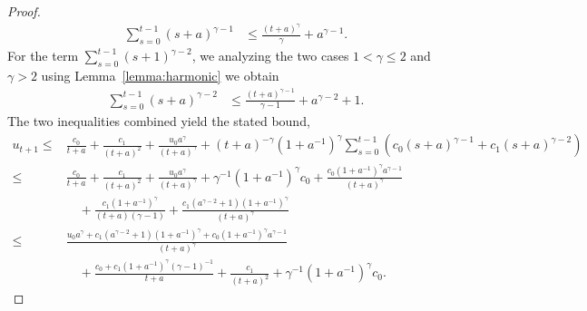 \begin{proof}
\begin{align*}
    \sum_{s=0}^{t-1}(s+a)^{\gamma - 1} &\leq \frac{(t+a)^\gamma}{\gamma} + a ^ {\gamma - 1}.
\end{align*}
For the term $\sum_{s=0}^{t-1}(s+1)^{\gamma - 2}$, we analyzing the two cases $1 < \gamma \leq 2$ and $\gamma > 2$ using Lemma~\ref{lemma:harmonic} we obtain
\begin{align*}
    \sum_{s=0}^{t-1}(s+a)^{\gamma - 2} &\leq \frac{(t+a)^{\gamma-1}}{\gamma - 1} + a^{\gamma - 2} + 1.
\end{align*}
The two inequalities combined yield the stated bound,
\begin{align*}
    u_{t+1} \leq & \frac{c_0}{t+a} + \frac{c_1}{(t+a)^2} + \frac{u_0 a ^ \gamma}{\left(t+a\right)^\gamma} + (t+a)^{-\gamma} (1 + a^{-1})^\gamma \sum_{s=0}^{t-1} \left( c_0(s+a)^{\gamma-1} + c_1(s+a)^{\gamma - 2} \right) \\
    \leq & \frac{c_0}{t+a} + \frac{c_1}{(t+a)^2} + \frac{u_0 a ^ \gamma}{\left(t+a\right)^\gamma} + \gamma^{-1}(1+a^{-1})^\gamma c_0 + \frac{c_0 (1+a^{-1})^\gamma a^{\gamma-1}}{(t+a)^\gamma} \\ 
    &\quad +\frac{c_1 (1+a^{-1})^\gamma}{(t+a)(\gamma - 1)} + \frac{c_1 (a^{\gamma-2} + 1) (1+a^{-1})^\gamma}{(t+a)^\gamma} \\
    \leq & \frac{u_0 a ^ \gamma + c_1 (a^{\gamma-2} + 1) (1+a^{-1})^\gamma + c_0 (1+a^{-1})^\gamma a^{\gamma-1}}{\left(t+a\right)^\gamma}  \\
    &\quad + \frac{c_0 + c_1 (1+a^{-1})^\gamma (\gamma - 1)^{-1}}{t+a} + \frac{c_1}{(t+a)^2} + \gamma^{-1}(1+a^{-1})^\gamma c_0 .
\end{align*}
\end{proof}

